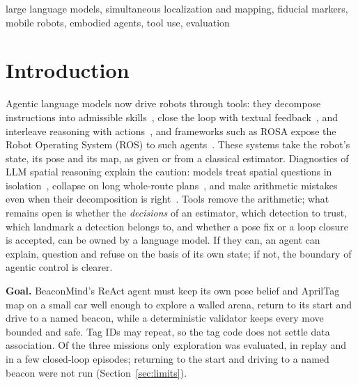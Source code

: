 \documentclass[conference]{IEEEtran}
\begin{document}
\begin{IEEEkeywords}
large language models, simultaneous localization and mapping, fiducial markers, mobile robots, embodied
agents, tool use, evaluation
\end{IEEEkeywords}

\section{Introduction}\label{sec:intro}
Agentic language models now drive robots through tools: they decompose instructions into admissible
skills~\cite{ahn2022saycan}, close the loop with textual feedback~\cite{huang2023inner}, and interleave
reasoning with actions~\cite{yao2023react}, and frameworks such as ROSA expose the Robot Operating System
(ROS) to such agents~\cite{royce2025rosa}. These systems take the robot's state, its pose and its map, as given
or from a classical estimator. Diagnostics of LLM spatial reasoning explain the caution: models
treat spatial questions in isolation~\cite{li2026llms}, collapse on long whole-route plans~\cite{jiang2026lost},
and make arithmetic mistakes even when their decomposition is right~\cite{gao2023pal}. Tools remove the
arithmetic; what remains open is whether the \emph{decisions} of an estimator, which detection to trust,
which landmark a detection belongs to, and whether a pose fix or a loop closure is accepted, can be owned
by a language model. If they can, an agent can explain, question and refuse on the basis of its own state;
if not, the boundary of agentic control is clearer.

\textbf{Goal.} BeaconMind's ReAct agent must keep its own pose belief and AprilTag map on a small car well
enough to explore a walled arena, return to its start and drive to a named beacon, while a deterministic
validator keeps every move bounded and safe. Tag IDs may repeat, so the tag code does not settle data association.
Of the three missions only exploration was evaluated, in replay and in a few closed-loop episodes; returning to the
start and driving to a named beacon were not run (Section~\ref{sec:limits}).
\end{document}
